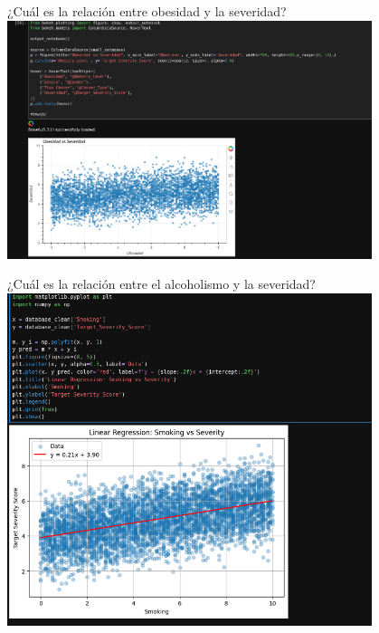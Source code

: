 \documentclass{beamer}
\begin{document}
    \begin{frame}[fragile]{¿Cuál es la relación entre obesidad y la severidad?}
    \center
    \hspace*{-1cm}
    \includegraphics[width=0.8\textwidth,keepaspectratio]{../figures/img7.png}
    \end{frame}
    \begin{frame}[fragile]{¿Cuál es la relación entre el alcoholismo y la severidad?}
    \center
    \hspace*{-1cm}
    \includegraphics[width=0.8\textwidth,keepaspectratio]{../figures/img9.png}
    \end{frame}
\end{document}
